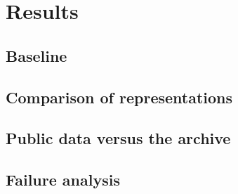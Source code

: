 \chapter{Results}
\label{ch:results}


\section{Baseline}

% 

\section{Comparison of representations}

\section{Public data versus the archive}

\section{Failure analysis}
